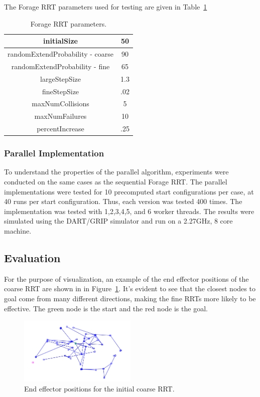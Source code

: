 \documentclass[conference]{IEEEtran}
\begin{document}
The Forage RRT parameters used for testing are given in Table~\ref{tab:ForageParams}

\begin{table}
	\centering
	\begin{tabular}{| c | c | }
        	\hline
		initialSize & 50 \\ \hline
  		randomExtendProbability - coarse & 90 \\ \hline
  		randomExtendProbability - fine & 65 \\ \hline
  		largeStepSize & 1.3\\ \hline
  		fineStepSize & .02\\ \hline
  		maxNumCollisions & 5\\ \hline
  		maxNumFailures & 10\\ \hline
		percentIncrease & .25\\ \hline 
	\end{tabular}
	\caption{Forage RRT parameters.} 
	\label{tab:ForageParams}
\end{table}

\subsubsection{Parallel Implementation}
To understand the properties of the parallel algorithm, experiments were conducted on the same cases as the sequential Forage RRT. The
parallel implementations were tested for 10 precomputed start configurations per case, at 40 runs per start configuration. Thus, each
version was tested 400 times. The implementation was tested with 1,2,3,4,5, and 6 worker threads. The results were simulated using the
DART/GRIP simulator and run on a 2.27GHz, 8 core machine.

\subsection{Evaluation}
For the purpose of visualization, an example of the end effector positions of the coarse RRT are shown in in Figure~\ref{fig:CoarseRRT}.
It's evident to see that the closest nodes to goal come from many different directions, making the fine RRTs more likely to be effective.
The green node is the start and the red node is the goal.

\begin{figure}[h!]
  \centering
    \includegraphics[width=0.5\textwidth]{figures/coarseRRTExample.png}
  \caption{End effector positions for the initial coarse RRT. \label{fig:CoarseRRT} }
\end{figure}
\end{document}
